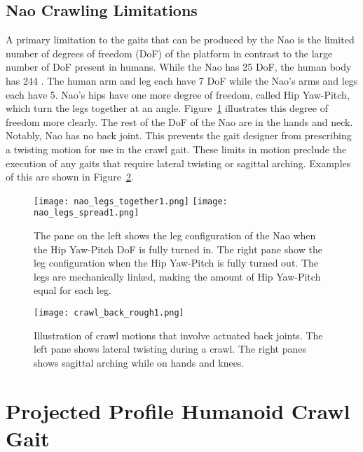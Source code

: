 \subsection{Nao Crawling Limitations}

A primary limitation to the gaits that can be produced by the Nao is the limited number of degrees of freedom (DoF) of the platform
in contrast to the large number of DoF present in humans. While the Nao has 25 DoF, the human body has 244 \cite{zatsiorskybiomechanics}.
The human arm and leg each have 7 DoF while the Nao's arms and legs each have 5. 
Nao's hips have one more degree of freedom, called Hip Yaw-Pitch, which turn the legs together at an angle. 
Figure~\ref{fig:nao_hips_legs1} illustrates this degree of freedom more clearly. 
The rest of the DoF of the Nao are in the hands and neck. 
Notably, Nao has no back joint. This prevents the gait designer from prescribing a twisting motion for use in the crawl gait.
These limits in motion preclude the execution of any gaits that require lateral twisting or sagittal arching.
Examples of this are shown in Figure~\ref{fig:crawl_back1}.

\begin{figure}
	\vspace*{-0.07in}
	\centerline{\texttt{[image: nao\_legs\_together1.png]}
				\texttt{[image: nao\_legs\_spread1.png]}
				}
	\caption{The pane on the left shows the leg configuration of the Nao when the Hip Yaw-Pitch DoF is fully turned in.
				The right pane show the leg configuration when the Hip Yaw-Pitch is fully turned out. 
				The legs are mechanically linked, making the amount of Hip Yaw-Pitch equal for each leg.}
	\label{fig:nao_hips_legs1}
	\vspace*{-0.2in}
\end{figure}

\begin{figure}
	\centering
	\texttt{[image: crawl\_back\_rough1.png]}
	\caption
	{Illustration of crawl motions that involve actuated back joints. The left pane shows lateral twisting during a crawl.
		The right panes shows sagittal arching while on hands and knees.}
	\label{fig:crawl_back1}
\end{figure}

\section{Projected Profile Humanoid Crawl Gait}

